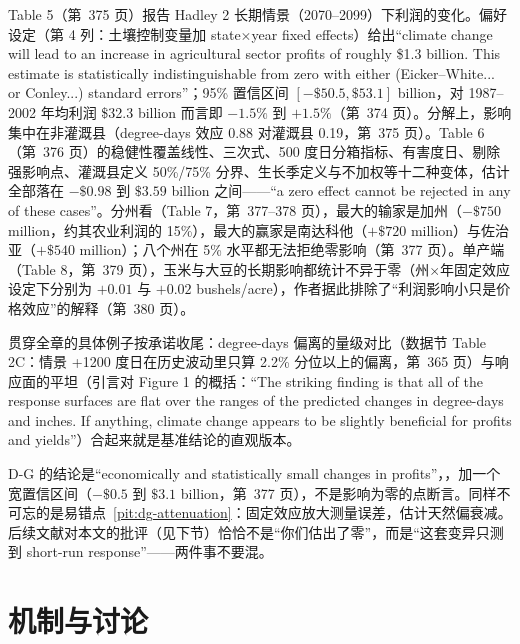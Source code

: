 Table 5（第~375 页）报告 Hadley 2 长期情景（2070--2099）下利润的变化。偏好设定（第 4 列：土壤控制变量加 state$\times$year fixed effects）给出``climate change will lead to an increase in agricultural sector profits of roughly \$1.3 billion. This estimate is statistically indistinguishable from zero with either (Eicker--White... or Conley...) standard errors''\citep[第~374 页]{deschenes2007economic}；95\% 置信区间 $[-\$50.5, \$53.1]$ billion，对 1987--2002 年均利润 \$32.3 billion 而言即 $-1.5\%$ 到 $+1.5\%$（第~374 页）。分解上，影响集中在非灌溉县（degree-days 效应 0.88 对灌溉县 0.19，第~375 页）。Table 6（第~376 页）的稳健性覆盖线性、三次式、500 度日分箱指标、有害度日、剔除强影响点、灌溉县定义 50\%/75\% 分界、生长季定义与不加权等十二种变体，估计全部落在 $-\$0.98$ 到 $\$3.59$ billion 之间——``a zero effect cannot be rejected in any of these cases''\citep[第~376 页]{deschenes2007economic}。分州看（Table 7，第~377--378 页），最大的输家是加州（$-\$750$ million，约其农业利润的 15\%），最大的赢家是南达科他（$+\$720$ million）与佐治亚（$+\$540$ million）；八个州在 5\% 水平都无法拒绝零影响（第~377 页）。单产端（Table 8，第~379 页），玉米与大豆的长期影响都统计不异于零（州$\times$年固定效应设定下分别为 $+0.01$ 与 $+0.02$ bushels/acre），作者据此排除了``利润影响小只是价格效应''的解释（第~380 页）。

贯穿全章的具体例子按承诺收尾：degree-days 偏离的量级对比（数据节 Table 2C：情景 +1200 度日在历史波动里只算 2.2\% 分位以上的偏离，第~365 页）与响应面的平坦（引言对 Figure 1 的概括：``The striking finding is that all of the response surfaces are flat over the ranges of the predicted changes in degree-days and inches. If anything, climate change appears to be slightly beneficial for profits and yields''\citep[第~355 页]{deschenes2007economic}）合起来就是基准结论的直观版本。

\begin{pitfall}
D-G 的结论是``economically and statistically small changes in profits''\citep[第~377 页]{deschenes2007economic}，\citep[第~377 页]{deschenes2007economic}，加一个宽置信区间（$-\$0.5$ 到 $\$3.1$ billion，第~377 页），不是影响为零的点断言。同样不可忘的是易错点~\ref{pit:dg-attenuation}：固定效应放大测量误差，估计天然偏衰减。后续文献对本文的批评（见下节）恰恰不是``你们估出了零''，而是``这套变异只测到 short-run response''——两件事不要混。
\end{pitfall}

\section{机制与讨论}

